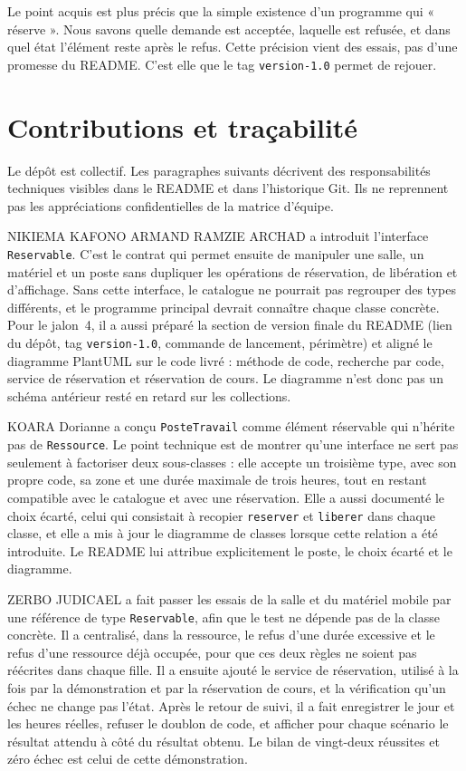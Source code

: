 \documentclass[11pt,a4paper]{article}
\begin{document}
Le point acquis est plus précis que la simple existence d'un programme qui « réserve ». Nous savons quelle demande est acceptée, laquelle est refusée, et dans quel état l'élément reste après le refus. Cette précision vient des essais, pas d'une promesse du README. C'est elle que le tag \texttt{version-1.0} permet de rejouer.

\section{Contributions et traçabilité}

Le dépôt est collectif. Les paragraphes suivants décrivent des responsabilités techniques visibles dans le README et dans l'historique Git. Ils ne reprennent pas les appréciations confidentielles de la matrice d'équipe.

NIKIEMA KAFONO ARMAND RAMZIE ARCHAD a introduit l'interface \texttt{Reservable}. C'est le contrat qui permet ensuite de manipuler une salle, un matériel et un poste sans dupliquer les opérations de réservation, de libération et d'affichage. Sans cette interface, le catalogue ne pourrait pas regrouper des types différents, et le programme principal devrait connaître chaque classe concrète. Pour le jalon~4, il a aussi préparé la section de version finale du README (lien du dépôt, tag \texttt{version-1.0}, commande de lancement, périmètre) et aligné le diagramme PlantUML sur le code livré : méthode de code, recherche par code, service de réservation et réservation de cours. Le diagramme n'est donc pas un schéma antérieur resté en retard sur les collections.

KOARA Dorianne a conçu \texttt{PosteTravail} comme élément réservable qui n'hérite pas de \texttt{Ressource}. Le point technique est de montrer qu'une interface ne sert pas seulement à factoriser deux sous-classes : elle accepte un troisième type, avec son propre code, sa zone et une durée maximale de trois heures, tout en restant compatible avec le catalogue et avec une réservation. Elle a aussi documenté le choix écarté, celui qui consistait à recopier \texttt{reserver} et \texttt{liberer} dans chaque classe, et elle a mis à jour le diagramme de classes lorsque cette relation a été introduite. Le README lui attribue explicitement le poste, le choix écarté et le diagramme.

ZERBO JUDICAEL a fait passer les essais de la salle et du matériel mobile par une référence de type \texttt{Reservable}, afin que le test ne dépende pas de la classe concrète. Il a centralisé, dans la ressource, le refus d'une durée excessive et le refus d'une ressource déjà occupée, pour que ces deux règles ne soient pas réécrites dans chaque fille. Il a ensuite ajouté le service de réservation, utilisé à la fois par la démonstration et par la réservation de cours, et la vérification qu'un échec ne change pas l'état. Après le retour de suivi, il a fait enregistrer le jour et les heures réelles, refuser le doublon de code, et afficher pour chaque scénario le résultat attendu à côté du résultat obtenu. Le bilan de vingt-deux réussites et zéro échec est celui de cette démonstration.
\end{document}
